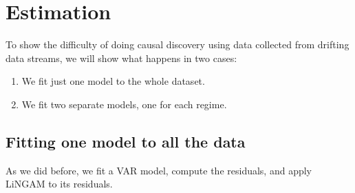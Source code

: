 \documentclass[letterpaper,10pt,english]{jupyterBook}
\begin{document}
\section{Estimation}
\label{\detokenize{notebooks/structural_breaks_example:estimation}}
\sphinxAtStartPar
To show the difficulty of doing causal discovery using data collected from drifting data streams, we will show what happens in two cases:
\begin{enumerate}
%
\item {} 
\sphinxAtStartPar
We fit just one model to the whole dataset.

\item {} 
\sphinxAtStartPar
We fit two separate models, one for each regime.

\end{enumerate}


\subsection{Fitting one model to all the data}
\label{\detokenize{notebooks/structural_breaks_example:fitting-one-model-to-all-the-data}}
\sphinxAtStartPar
As we did before, we fit a VAR model, compute the residuals, and apply LiNGAM to its residuals.
\end{document}
